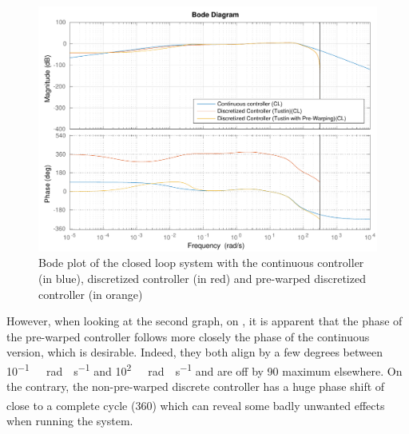 \begin{figure}[H]
  \centering
  \includegraphics[scale=.67]{figures/prewarpVsNoPrewarpVsContinuousBodeClosedLoop.pdf}
  \caption{Bode plot of the closed loop system with the continuous controller\\(in blue), discretized controller (in red) and pre-warped discretized controller (in orange)}
  \label{fig:bodePrewarpVsNoPrewarpVsContinuousClosedLoop}
\end{figure}
%
However, when looking at the second graph, on , it is apparent that the phase of the pre-warped controller follows more closely the phase of the continuous version, which is desirable. Indeed, they both align by a few degrees between \si{10^{-1}\ rad \cdot s^{-1}} and \si{10^{2}\ rad \cdot s^{-1}} and are off by \si{90^{\circ}} maximum elsewhere. On the contrary, the non-pre-warped discrete controller has a huge phase shift of close to a complete cycle (\si{360^{\circ}}) which can reveal some badly unwanted effects when running the system.

